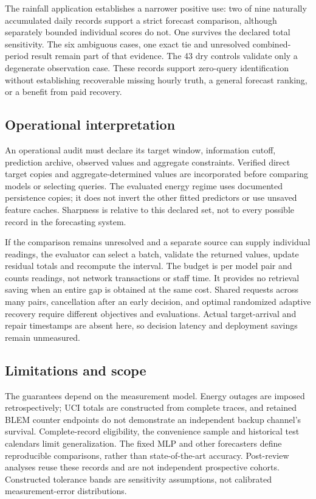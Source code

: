 \documentclass[12pt]{article}
\begin{document}
The rainfall application establishes a narrower positive use: two of nine
naturally accumulated daily records support a strict forecast comparison,
although separately bounded individual scores do not. One survives the
declared total sensitivity. The six ambiguous cases, one exact tie and
unresolved combined-period result remain part of that evidence. The 43
dry controls validate only a degenerate observation case. These records
support zero-query identification without establishing recoverable missing
hourly truth, a general forecast ranking, or a benefit from paid recovery.

\subsection{Operational interpretation}
An operational audit must declare its target window, information cutoff,
prediction archive, observed values and aggregate constraints. Verified
direct target copies and aggregate-determined values are incorporated
before comparing models or selecting queries. The evaluated energy regime
uses documented persistence copies; it does not invert the other fitted
predictors or use unsaved feature caches. Sharpness is relative to this
declared set, not to every possible record in the forecasting system.

If the comparison remains unresolved and a separate source can supply
individual readings, the evaluator can select a batch, validate the returned
values, update residual totals and recompute the interval. The budget is
per model pair and counts readings, not network transactions or staff time.
It provides no retrieval saving when an entire gap is obtained at the same
cost. Shared requests across many pairs, cancellation after an early decision,
and optimal randomized adaptive recovery require different objectives and
evaluations. Actual target-arrival and repair timestamps are absent here,
so decision latency and deployment savings remain unmeasured.

\subsection{Limitations and scope}
The guarantees depend on the measurement model. Energy outages are imposed
retrospectively; UCI totals are constructed from complete traces, and retained
BLEM counter endpoints do not demonstrate an independent backup channel's
survival. Complete-record eligibility, the convenience sample and historical
test calendars limit generalization. The fixed MLP and other forecasters
define reproducible comparisons, rather than state-of-the-art accuracy.
Post-review analyses reuse these records and are not independent prospective
cohorts. Constructed tolerance bands are sensitivity assumptions, not
calibrated measurement-error distributions.
\end{document}
